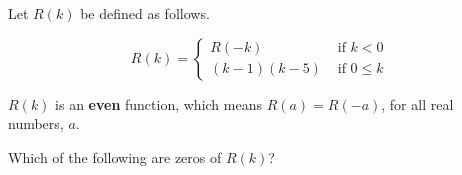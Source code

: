 \documentclass{ximera}
\author{Lee Wayand}
\begin{document}
\begin{exercise}




Let $R(k)$ be defined as follows.

\[
R(k) = 
\begin{cases}
  R(-k) & \text{ if }  k < 0 \\
  (k-1)(k-5) & \text{ if } 0 \leq k 
\end{cases}
\]

$R(k)$ is an \textbf{even} function, which means $R(a) = R(-a)$, for all real numbers, $a$. \\


\begin{question}



Which of the following are zeros of $R(k)$?


\begin{selectAll}
\end{selectAll}

\end{question}


\end{exercise}
\end{document}
